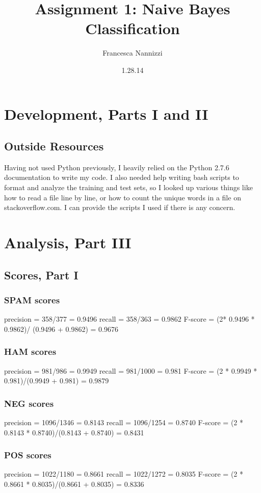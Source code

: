 \documentclass[12pt]{article}
\begin{document}
\title{Assignment 1: Naive Bayes Classification }
\author{Francesca Nannizzi}
\date{1.28.14}
\maketitle

\section{Development, Parts I and II}
\subsection{Outside Resources}
Having not used Python previously, I heavily relied on the Python 2.7.6 documentation to write my code. I also needed help writing bash scripts to format and analyze the training and test sets, so I looked up various things like how to read a file line by line, or how to count the unique words in a file on stackoverflow.com. I can provide the scripts I used if there is any concern.

\section{Analysis, Part III}
\subsection{Scores, Part I}
\subsubsection{SPAM scores}
precision = 358/377 = 0.9496
recall = 358/363 = 0.9862
F-score = (2* 0.9496 * 0.9862)/ (0.9496 + 0.9862) = 0.9676

\subsubsection{HAM scores}
precision = 981/986 = 0.9949 
recall = 981/1000 = 0.981
F-score = (2 * 0.9949 * 0.981)/(0.9949 + 0.981) = 0.9879

\subsubsection{NEG scores}
precision = 1096/1346 = 0.8143
recall = 1096/1254 = 0.8740
F-score = (2 * 0.8143 * 0.8740)/(0.8143 + 0.8740) = 0.8431

\subsubsection{POS scores}
precision = 1022/1180 = 0.8661
recall = 1022/1272 = 0.8035
F-score = (2 * 0.8661 * 0.8035)/(0.8661 + 0.8035) = 0.8336
\end{document}

